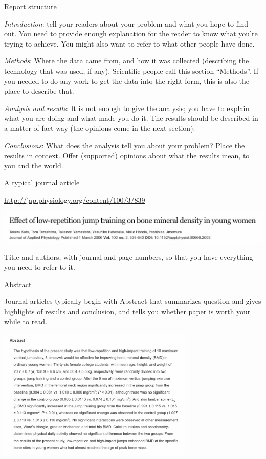\documentclass[ignorenonframetext,]{beamer}
\begin{document}
\begin{frame}{Report structure}
\protect\hypertarget{report-structure}{}

\emph{Introduction}: tell your readers about your problem and what you
hope to find out. You need to provide enough explanation for the reader
to know what you're trying to achieve. You might also want to refer to
what other people have done.

\emph{Methods}: Where the data came from, and how it was collected
(describing the technology that was used, if any). Scientific people
call this section ``Methods''. If you needed to do any work to get the
data into the right form, this is also the place to describe that.

\emph{Analysis and results}: It is not enough to give the analysis; you
have to explain what you are doing and what made you do it. The results
should be described in a matter-of-fact way (the opinions come in the
next section).

\emph{Conclusions}: What does the analysis tell you about your problem?
Place the results in context. Offer (supported) opinions about what the
results mean, to you and the world.

\end{frame}

\begin{frame}{A typical journal article}
\protect\hypertarget{a-typical-journal-article}{}

\url{http://jap.physiology.org/content/100/3/839}

\includegraphics[width=\textwidth]{titlebar}

Title and authors, with journal and page numbers, so that you have
everything you need to refer to it.

\end{frame}

\begin{frame}{Abstract}
\protect\hypertarget{abstract}{}

Journal articles typically begin with Abstract that summarizes question
and gives highlights of results and conclusion, and tells you whether
paper is worth your while to read.

\includegraphics[width=0.7\textwidth]{abstract}

\end{frame}
\end{document}
